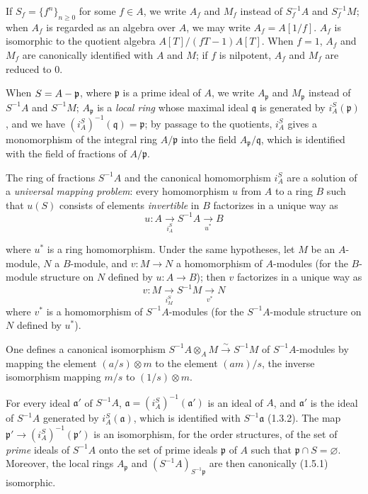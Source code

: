 \begin{env}[1.2.3]
\label{0.1.2.3}
If $S_f=\{f^n\}_{n\geq 0}$ for some $f\in A$, we write $A_f$ and $M_f$ instead of $S_f^{-1}A$ and $S_f^{-1}M$; when $A_f$ is regarded as an algebra over $A$, we may write $A_f=A[1/f]$.
$A_f$ is isomorphic to the quotient algebra $A[T]/(fT-1)A[T]$.
When $f=1$, $A_f$ and $M_f$ are canonically identified with $A$ and $M$; if $f$ is nilpotent, $A_f$ and $M_f$ are reduced to $0$.

When $S=A-\mathfrak{p}$, where $\mathfrak{p}$ is a prime ideal of $A$, we write $A_{\mathfrak{p}}$ and $M_{\mathfrak{p}}$ instead of $S^{-1}A$ and $S^{-1}M$; $A_{\mathfrak{p}}$ is a \emph{local ring} whose maximal ideal $\mathfrak{q}$ is generated by $i_A^S(\mathfrak{p})$, and we have $(i_A^S)^{-1}(\mathfrak{q})=\mathfrak{p}$; by passage to the quotients, $i_A^S$ gives a monomorphism of the integral ring $A/\mathfrak{p}$ into the field $A_{\mathfrak{p}}/\mathfrak{q}$, which is identified with the field of fractions of $A/\mathfrak{p}$.
\end{env}

\begin{env}[1.2.4]
\label{0.1.2.4}
The ring of fractions $S^{-1}A$ and the canonical homomorphism $i_A^S$ are a solution of a \emph{universal mapping problem}: every homomorphism $u$ from $A$ to a ring $B$ such that $u(S)$ consists of elements \emph{invertible} in $B$ factorizes in a unique way as
\[
  u:A\xrightarrow[i_A^S]{}S^{-1}A\xrightarrow[u^*]{}B
\]

where $u^*$ is a ring homomorphism.
Under the same hypotheses, let $M$ be an $A$-module, $N$ a $B$-module, and $v:M\to N$ a homomorphism of $A$-modules (for the $B$-module structure on $N$ defined by $u:A\to B$); then $v$ factorizes in a unique way as
\[
  v:M\xrightarrow[i_M^S]{}S^{-1}M\xrightarrow[v^*]{}N
\]
where $v^*$ is a homomorphism of $S^{-1}A$-modules (for the $S^{-1}A$-module structure on $N$ defined by $u^*$).
\end{env}

\begin{env}[1.2.5]
\label{0.1.2.5}
One defines a canonical isomorphism $S^{-1}A\otimes_A M\xrightarrow{\sim}S^{-1}M$ of $S^{-1}A$-modules by mapping the element $(a/s)\otimes m$ to the element $(am)/s$, the inverse isomorphism mapping $m/s$ to $(1/s)\otimes m$.
\end{env}

\begin{env}[1.2.6]
\label{0.1.2.6}
For every ideal $\mathfrak{a}'$ of $S^{-1}A$, $\mathfrak{a}=(i_A^S)^{-1}(\mathfrak{a}')$ is an ideal of $A$, and $\mathfrak{a}'$ is the ideal of $S^{-1}A$ generated by $i_A^S(\mathfrak{a})$, which is identified with $S^{-1}\mathfrak{a}$ (1.3.2).
The map $\mathfrak{p}'\to(i_A^S)^{-1}(\mathfrak{p}')$ is an isomorphism, for the order structures, of the set of \emph{prime} ideals of $S^{-1}A$ onto the set of prime ideals $\mathfrak{p}$ of $A$ such that $\mathfrak{p}\cap S=\varnothing$.
Moreover, the local rings $A_{\mathfrak{p}}$ and $(S^{-1}A)_{S^{-1}\mathfrak{p}}$ are then canonically (1.5.1) isomorphic.
\end{env}

